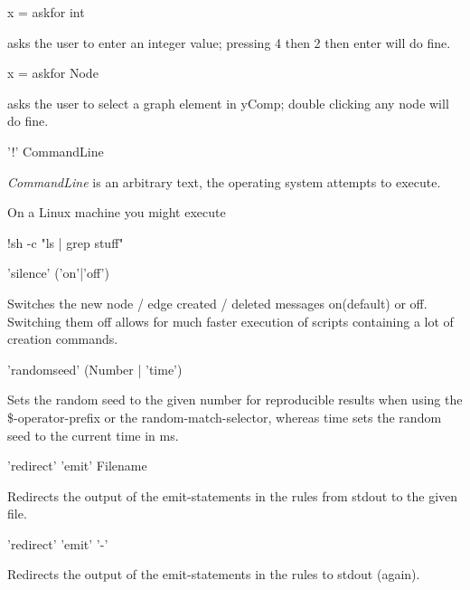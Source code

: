 \begin{example}
\begin{grshelllet}
x = askfor int
\end{grshelllet}
asks the user to enter an integer value; pressing 4 then 2 then enter will do fine.
\begin{grshelllet}
x = askfor Node
\end{grshelllet}
asks the user to select a graph element in yComp; double clicking any node will do fine. 
\end{example}

\begin{rail}
  '!' CommandLine
\end{rail}
\emph{CommandLine} is an arbitrary text, the operating system attempts to execute.
\begin{example}
On a Linux machine you might execute
\begin{grshell}
!sh -c "ls | grep stuff"
\end{grshell}
\end{example}

\begin{rail}
'silence' ('on'|'off')
\end{rail}
Switches the new node / edge created / deleted messages on(default) or off.
Switching them off allows for much faster execution of scripts containing a lot of creation commands.

\begin{rail}
'randomseed' (Number | 'time')
\end{rail}
Sets the random seed to the given number for reproducible results when using the \$-operator-prefix or the random-match-selector, whereas time sets the random seed to the current time in ms.

\begin{rail}
'redirect' 'emit' Filename
\end{rail}
Redirects the output of the emit-statements in the rules from stdout to the given file.

\begin{rail}
'redirect' 'emit' '-'
\end{rail}
Redirects the output of the emit-statements in the rules to stdout (again).

